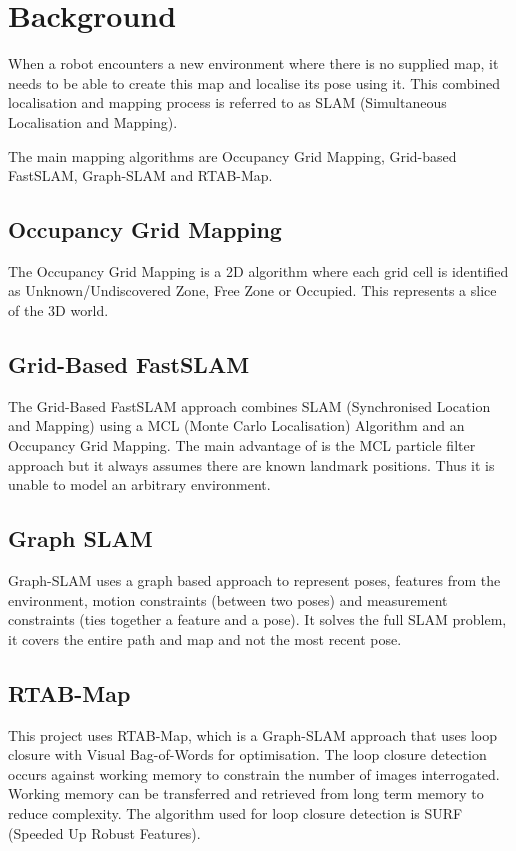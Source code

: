 \documentclass[10pt,journal,compsoc]{IEEEtran}
\begin{document}
\section{Background}
When a robot encounters a new environment where there is no supplied map, it needs to be able to create this map and localise its pose using it. This combined localisation and mapping process is referred to as SLAM (Simultaneous Localisation and Mapping).

The main mapping algorithms are Occupancy Grid Mapping, Grid-based FastSLAM, Graph-SLAM and RTAB-Map.

\subsection{Occupancy Grid Mapping}
The Occupancy Grid Mapping\cite{occgripmap} is a 2D algorithm where each grid cell is identified as Unknown/Undiscovered Zone, Free Zone or Occupied. This represents a slice of the 3D world.

\subsection{Grid-Based FastSLAM}
The Grid-Based FastSLAM\cite{gridslam} approach combines SLAM (Synchronised Location and Mapping) using a MCL (Monte Carlo Localisation) Algorithm and an Occupancy Grid Mapping. The main advantage of is the MCL particle filter approach but it always assumes there are known landmark positions. Thus it is unable to model an arbitrary environment.

\subsection{Graph SLAM}
Graph-SLAM\cite{graphslam} uses a graph based approach to represent poses, features from the environment, motion constraints (between two poses) and measurement constraints (ties together a feature and a pose). It solves the full SLAM problem, it covers the entire path and map and not the most recent pose.

\subsection{RTAB-Map}
This project uses RTAB-Map\cite{rosrtabmap}, which is a Graph-SLAM approach that uses loop closure with Visual Bag-of-Words\cite{vbow} for optimisation.
The loop closure detection occurs against working memory to constrain the number of images interrogated. Working memory can be transferred and retrieved from long term memory to reduce complexity. The algorithm used for loop closure detection is SURF (Speeded Up Robust Features)\cite{surf}.
\end{document}
